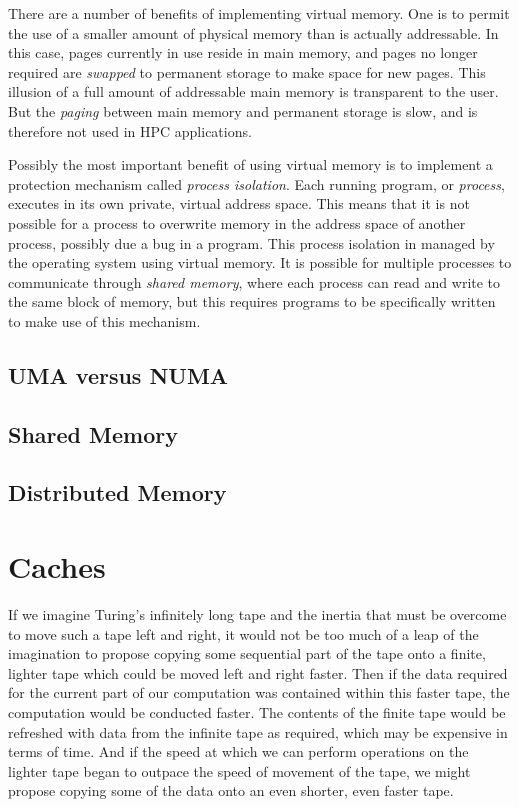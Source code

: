 \documentclass{report}
\begin{document}
There are a number of benefits of implementing virtual memory. One is to permit the use of a smaller amount of physical memory than is actually addressable. In this case, pages currently in use reside in main memory, and pages no longer required are \emph{swapped} to permanent storage to make space for new pages. This illusion of a full amount of addressable main memory is transparent to the user. But the \emph{paging} between main memory and permanent storage is slow, and is therefore not used in HPC applications.

Possibly the most important benefit of using virtual memory is to implement a protection mechanism called \emph{process isolation}. Each running program, or \emph{process}, executes in its own private, virtual address space. This means that it is not possible for a process to overwrite memory in the address space of another process, possibly due a bug in a program. This process isolation in managed by the operating system using virtual memory. It is possible for multiple processes to communicate through \emph{shared memory}, where each process can read and write to the same block of memory, but this requires programs to be specifically written to make use of this mechanism. 

  
\subsection{UMA versus NUMA}

\subsection{Shared Memory}

\subsection{Distributed Memory}


%
%
\section{Caches}

If we imagine Turing's infinitely long tape and the inertia that must be overcome to move such a tape left and right, it would not be too much of a leap of the imagination to propose copying some sequential part of the tape onto a finite, lighter tape which could be moved left and right faster. Then if the data required for the current part of our computation was contained within this faster tape, the computation would be conducted faster. The contents of the finite tape would be refreshed with data from the infinite tape as required, which may be expensive in terms of time. And if the speed at which we can perform operations on the lighter tape began to outpace the speed of movement of the tape, we might propose copying some of the data onto an even shorter, even faster tape.
\end{document}
